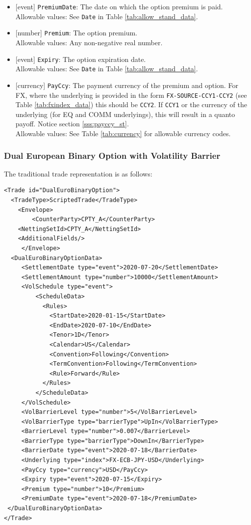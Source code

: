 \begin{itemize}
  \item{}[event] \lstinline!PremiumDate!: The date on which the option premium is paid. \\
  Allowable values: See \lstinline!Date! in Table \ref{tab:allow_stand_data}.
  \item{}[number] \lstinline!Premium!: The option premium. \\
  Allowable values: Any non-negative real number.
  \item{}[event] \lstinline!Expiry!: The option expiration date. \\
  Allowable values: See \lstinline!Date! in Table \ref{tab:allow_stand_data}.
  \item{}[currency] \lstinline!PayCcy!: The payment currency of the premium and option. For FX, where the underlying is provided
      in the form \lstinline!FX-SOURCE-CCY1-CCY2! (see Table \ref{tab:fxindex_data}) this should
      be \lstinline!CCY2!. If \lstinline!CCY1! or the currency of the underlying (for EQ and
      COMM underlyings), this will result in a quanto payoff. Notice section \ref{sss:payccy_st}. \\
        Allowable values: See Table \ref{tab:currency} for allowable currency codes.
\end{itemize}

\subsubsection*{Dual European Binary Option with Volatility Barrier}

The traditional trade representation is as follows:

\begin{verbatim}
<Trade id="DualEuroBinaryOption">
  <TradeType>ScriptedTrade</TradeType>
    <Envelope>
        <CounterParty>CPTY_A</CounterParty>
  	<NettingSetId>CPTY_A</NettingSetId>
  	<AdditionalFields/>
     </Envelope>
  <DualEuroBinaryOptionData>
     <SettlementDate type="event">2020-07-20</SettlementDate>
     <SettlementAmount type="number">10000</SettlementAmount>
     <VolSchedule type="event">
         <ScheduleData>
           <Rules>
             <StartDate>2020-01-15</StartDate>
             <EndDate>2020-07-10</EndDate>
             <Tenor>1D</Tenor>
             <Calendar>US</Calendar>
             <Convention>Following</Convention>
             <TermConvention>Following</TermConvention>
             <Rule>Forward</Rule>
           </Rules>
         </ScheduleData>
     </VolSchedule>
     <VolBarrierLevel type="number">5</VolBarrierLevel>
     <VolBarrierType type="barrierType">UpIn</VolBarrierType>
     <BarrierLevel type="number">0.007</BarrierLevel>
     <BarrierType type="barrierType">DownIn</BarrierType>
     <BarrierDate type="event">2020-07-18</BarrierDate>
     <Underlying type="index">FX-ECB-JPY-USD</Underlying>
     <PayCcy type="currency">USD</PayCcy>
     <Expiry type="event">2020-07-15</Expiry>
     <Premium type="number">10</Premium>
     <PremiumDate type="event">2020-07-18</PremiumDate>
 </DualEuroBinaryOptionData>
</Trade>
\end{verbatim}

